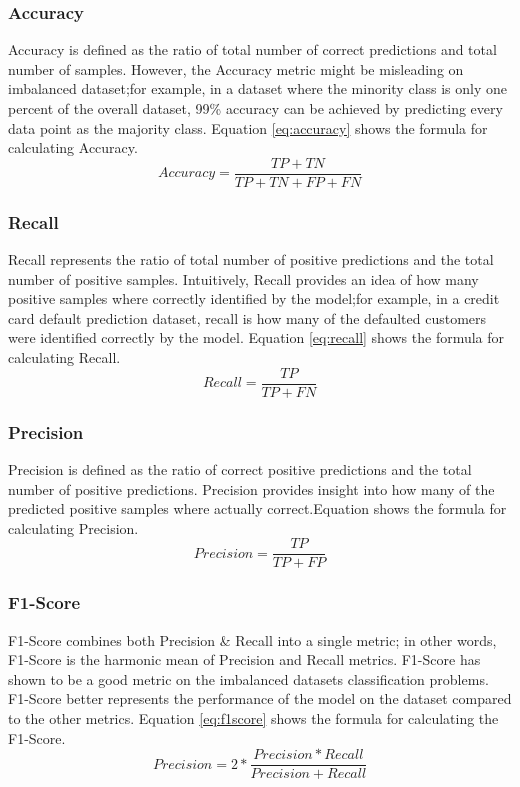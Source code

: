 \documentclass[twoside,11pt,a4paper]{article}
\begin{document}
\subsubsection{Accuracy}
Accuracy is defined as the ratio of total number of correct predictions and total number of samples. However, the Accuracy metric might be misleading on imbalanced dataset;for example, in a dataset where the minority class is only one percent of the overall dataset, 99\% accuracy can be achieved by predicting every data point as the majority class. Equation \ref{eq:accuracy} shows the formula for calculating Accuracy.
\begin{equation} \label{eq:accuracy}
	Accuracy = \frac{TP+TN}{TP+TN+FP+FN}
\end{equation}
\subsubsection{Recall}
Recall represents the ratio of total number of positive predictions and the total number of positive samples. Intuitively, Recall provides an idea of how many positive samples where correctly identified by the model;for example, in a credit card default prediction dataset, recall is how many of the defaulted customers were identified correctly by the model. Equation \ref{eq:recall} shows the formula for calculating Recall.
\begin{equation}\label{eq:recall}
	Recall = \frac{TP}{TP+FN}
\end{equation}
\subsubsection{Precision}
Precision is defined as the ratio of correct positive predictions and the total number of positive predictions. Precision provides insight into how many of the predicted positive samples where actually correct.Equation \label{eq:precision} shows the formula for calculating Precision.
\begin{equation}\label{eq:precision}
	Precision = \frac{TP}{TP+FP}
\end{equation}

\subsubsection{F1-Score}
F1-Score combines both Precision \& Recall into a single metric; in other words, F1-Score is the harmonic mean of Precision and Recall metrics. F1-Score has shown to be a good metric on the imbalanced datasets classification problems. F1-Score better represents the performance of the model on the dataset compared to the other metrics. Equation \ref{eq:f1score} shows the formula for calculating the F1-Score.
\begin{equation}\label{eq:f1score}
	Precision = 2 * \frac{Precision*Recall}{Precision + Recall}
\end{equation}
\end{document}
